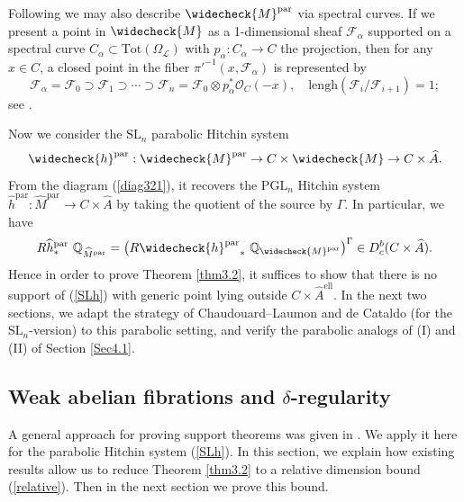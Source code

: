 \documentclass[11pt]{amsart}
\theoremstyle{plain}
\theoremstyle{definition}
\theoremstyle{remark}
\newcommand{\BQ}{{\mathbb{Q}}}
\newcommand{\CF}{{\mathcal F}}
\newcommand{\CL}{{\mathcal L}}
\newcommand{\CO}{{\mathcal O}}
\begin{document}
Following \cite[Example 2.2.5]{Yun1} we may also describe $\widecheck{M}^{\mathrm{par}}$ via spectral curves. If we present a point in $\widecheck{M}$ as a 1-dimensional sheaf $\CF_\alpha$ supported on a spectral curve $C_\alpha \subset \mathrm{Tot}(\Omega_\CL)$ with $p_\alpha: C_\alpha \to C$ the projection, then for any $x\in C$, a closed point in the fiber $\pi'^{-1}(x, \CF_\alpha)$ is represented by
\[
\CF_\alpha = \CF_0 \supset \CF_1 \supset \cdots \supset \CF_n = \CF_0\otimes p_\alpha^* \CO_C(-x), \quad \mathrm{lengh}(\CF_i/\CF_{i+1}) = 1;
\]
see \cite[(2.4)]{Yun1}.

Now we consider the $\mathrm{SL}_n$ parabolic Hitchin system
\begin{equation}\label{SLh}
\widecheck{h}^{\mathrm{par}}: \widecheck{M}^{\mathrm{par}} \to C\times \widecheck{M} \to C\times \widehat{A}.
\end{equation}
From the diagram (\ref{diag321}), it recovers the $\mathrm{PGL}_n$ Hitchin system $\widehat{h}^{\mathrm{par}}: \widehat{M}^{\mathrm{par}} \to C \times \widehat{A}$ by taking the quotient of the source by $\Gamma$. In particular, we have
\[
R{\widehat{h}^{\mathrm{par}}}_* ~\BQ_{\widehat{M}^{\mathrm{par}}} = \left(R{\widecheck{h}^{\mathrm{par}}}_* ~\BQ_{\widecheck{M}^{\mathrm{par}}}\right)^\Gamma \in D_c^b(C\times \widehat{A}).
\]
Hence in order to prove Theorem \ref{thm3.2}, it suffices to show that there is no support of (\ref{SLh}) with generic point lying outside $C \times \widehat{A}^{\mathrm{ell}}$. In the next two sections, we adapt the strategy of Chaudouard--Laumon \cite{CL} and de Cataldo \cite{dC_SL} (for the $\mathrm{SL}_n$-version) to this parabolic setting, and verify the parabolic analogs of (I) and (II) of Section \ref{Sec4.1}. 




\subsection{Weak abelian fibrations and $\delta$-regularity}

A general approach for proving support theorems was given in \cite[Theorem 1.8]{MS2}. We apply it here for the parabolic Hitchin system (\ref{SLh}). In this section, we explain how existing results allow us to reduce Theorem \ref{thm3.2} to a relative dimension bound (\ref{relative}). Then in the next section we prove this bound. 
\end{document}

